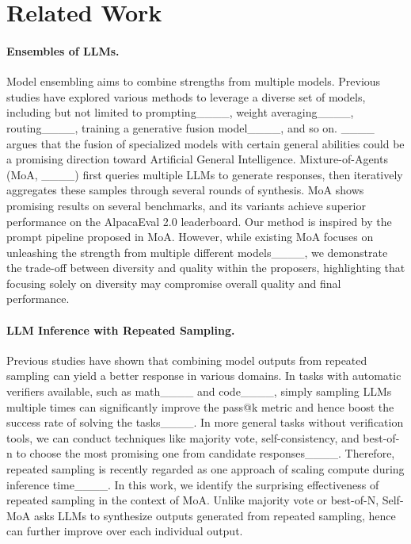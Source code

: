 \section{Related Work}
\label{sect:related_work}

\paragraph{Ensembles of LLMs.} 
Model ensembling aims to combine strengths from multiple models. Previous studies have explored various methods to leverage a diverse set of models, including but not limited to prompting____, 
weight averaging____, routing____, training a generative fusion model____, and so on. ____ argues that the fusion of specialized models with certain general abilities could be a promising direction toward Artificial General Intelligence. 
Mixture-of-Agents (MoA, ____) first queries multiple LLMs to generate responses, then iteratively aggregates these samples through several rounds of synthesis. MoA shows promising results on several benchmarks, and its variants achieve superior performance on the AlpacaEval 2.0 leaderboard. 
Our method is inspired by the prompt pipeline proposed in MoA. However, while existing MoA focuses on unleashing the strength from multiple different models____, we demonstrate the trade-off between diversity and quality within the proposers, highlighting that focusing solely on diversity may compromise overall quality and final performance.

\paragraph{LLM Inference with Repeated Sampling.}
Previous studies have shown that combining model outputs from repeated sampling can yield a better response in various domains. In tasks with automatic verifiers available, such as math____ and code____, simply sampling LLMs multiple times can significantly improve the pass@k metric and hence boost the success rate of solving the tasks____. In more general tasks without verification tools, we can conduct techniques like majority vote, self-consistency, and best-of-n to choose the most promising one from candidate responses____.
Therefore, repeated sampling is recently regarded as one approach of scaling compute during inference time____.
In this work, we identify the surprising effectiveness of repeated sampling in the context of MoA. Unlike majority vote or best-of-N, Self-MoA asks LLMs to synthesize outputs generated from repeated sampling, hence can further improve over each individual output.

